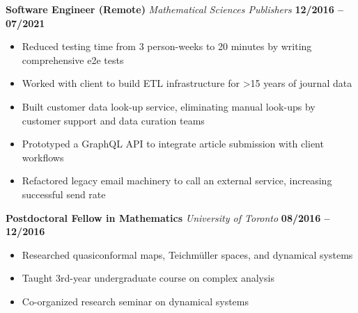 \documentclass[11pt]{article}
\newcommand\verticalspace{\vspace{0.5cm}}
\begin{document}
\textbf{Software Engineer (Remote)} \emph{Mathematical Sciences Publishers} \hfill \textbf{12/2016 -- 07/2021}
\begin{itemize}
  \item Reduced testing time from 3 person-weeks to 20 minutes by writing comprehensive e2e tests
  \item Worked with client to build ETL infrastructure for >15 years of journal data
  \item Built customer data look-up service, eliminating manual look-ups by customer support and data curation teams
  \item Prototyped a GraphQL API to integrate article submission with client workflows
  \item Refactored legacy email machinery to call an external service, increasing successful send rate
\end{itemize}

\verticalspace

\textbf{Postdoctoral Fellow in Mathematics} \emph{University of Toronto} \hfill \textbf{08/2016 -- 12/2016}
\begin{itemize}
  \item Researched quasiconformal maps, Teichm\"{u}ller spaces, and dynamical systems
  \item Taught 3rd-year undergraduate course on complex analysis
  \item Co-organized research seminar on dynamical systems
\end{itemize}
\end{document}
